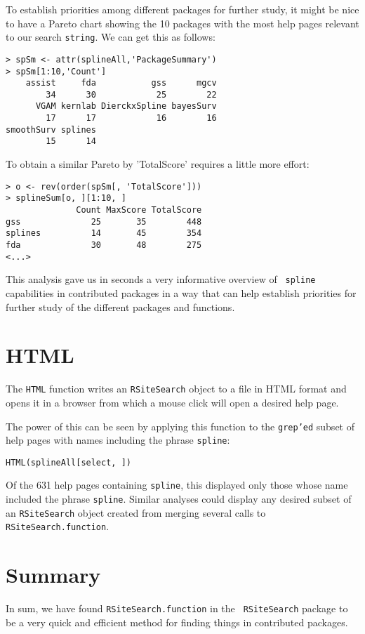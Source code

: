To establish priorities among different packages for further study, it
might be nice to have a Pareto chart showing the 10 packages with the
most help pages relevant to our search {\tt string}.  We can get this as
follows:
\begin{verbatim}
> spSm <- attr(splineAll,'PackageSummary')
> spSm[1:10,'Count']
    assist     fda           gss      mgcv
        34      30            25        22
      VGAM kernlab DierckxSpline bayesSurv
        17      17            16        16
smoothSurv splines
        15      14
\end{verbatim}
To obtain a similar Pareto by 'TotalScore' requires a little more
effort:
\begin{verbatim}
> o <- rev(order(spSm[, 'TotalScore']))
> splineSum[o, ][1:10, ]
              Count MaxScore TotalScore
gss              25       35        448
splines          14       45        354
fda              30       48        275
<...>
\end{verbatim}
This analysis gave us in seconds a very informative overview of {\tt
spline} capabilities in contributed \R{} packages in a way that can help
establish priorities for further study of the different packages and
functions.

\section*{HTML}
The {\tt HTML} function writes an {\tt RSiteSearch} object to a file
in HTML format and opens it in a browser from which a mouse click will
open a desired help page.

The power of this can be seen by applying this function to the
{\tt grep'ed} subset of help pages with names including the phrase
{\tt spline}:

\begin{verbatim}
HTML(splineAll[select, ])
\end{verbatim}

Of the 631 help pages containing {\tt spline}, this displayed only
those whose name included the phrase {\tt spline}.  Similar analyses
could display any desired subset of an {\tt RSiteSearch} object
created from merging several calls to {\tt RSiteSearch.function}.

\section*{Summary}
In sum, we have found {\tt RSiteSearch.function} in the {\tt
RSiteSearch} package to be a very quick and efficient method for
finding things in contributed packages.

